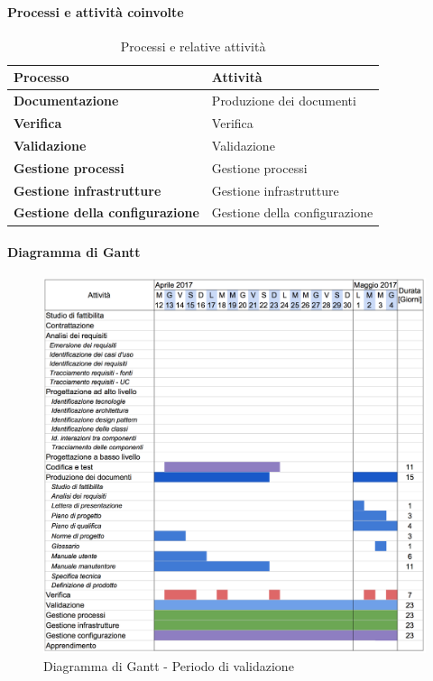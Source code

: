 		\paragraph{Processi e attività coinvolte}
			\begin{table}[H]
				\centering
				\begin{tabular}{ll}
					\toprule
					\textbf{Processo}                           & \textbf{Attività}              \\
					\midrule
					\textbf{Documentazione}            & Produzione dei documenti       \\
					\midrule
					\textbf{Verifica}                  & Verifica                       \\
					\midrule
					\textbf{Validazione}               & Validazione                    \\
					\midrule
					\textbf{Gestione processi} 					& Gestione processi              \\
					\midrule
					\textbf{Gestione infrastrutture}				& Gestione infrastrutture        \\
					\midrule
					\textbf{Gestione della configurazione}				& Gestione della configurazione        \\
					\bottomrule
				\end{tabular}
				\caption{Processi e relative attività}
				\label{Va-ProcessiAttività}
			\end{table}
		\paragraph{Diagramma di Gantt}
		\begin{figure}[H]
			\centering
			\includegraphics[width=\textwidth]{img/Gantt/g4c.png}
			\caption{Diagramma di Gantt - Periodo di validazione}
		\end{figure}
		
